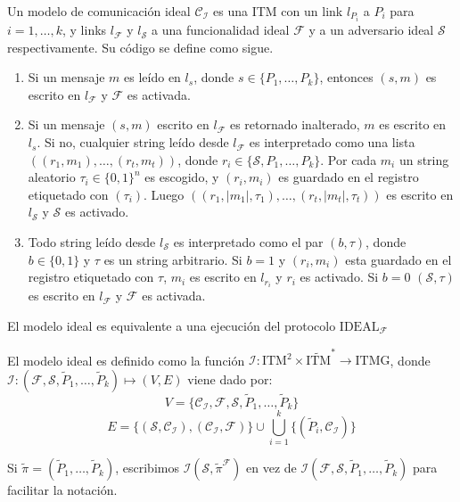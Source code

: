 \begin{definicion}
Un modelo de comunicación ideal $\mathcal{C_I}$ es una ITM con un link $l_{P_i}$ a 
$P_i$ para $i = 1, \ldots, k$,
y links $l_\mathcal{F}$ y $l_\mathcal{S}$ a una funcionalidad ideal $\mathcal{F}$
y a un adversario ideal $\mathcal{S}$ respectivamente. Su código se define como sigue.
\begin{enumerate}
  \item Si un mensaje $m$ es leído en $l_s$, donde $s \in \{P_1, \ldots, P_k\}$,
        entonces $(s, m)$ es escrito en $l_\mathcal{F}$ y $\mathcal{F}$ es activada.
  \item Si un mensaje $(s, m)$ escrito en $l_\mathcal{F}$ es retornado inalterado, $m$ es
        escrito en $l_s$. Si no, cualquier string leído desde $l_\mathcal{F}$ es interpretado
        como una lista $((r_1, m_1), \ldots, (r_t, m_t))$, donde $r_i \in \{\mathcal{S},
        P_1, \ldots, P_k\}$. Por cada $m_i$ un string aleatorio $\tau_i \in \{0, 1\}^n$ es
        escogido, y $(r_i, m_i)$ es guardado en el registro etiquetado con $(\tau_i)$. Luego
        $((r_1, |m_1|, \tau_1), \ldots, (r_t, |m_t|, \tau_t))$ es
        escrito en $l_\mathcal{S}$ y $\mathcal{S}$ es activado.
  \item Todo string leído desde $l_\mathcal{S}$ es interpretado como el par $(b, \tau)$, donde
        $b \in \{0, 1\}$ y $\tau$ es un string arbitrario. Si $b = 1$ y $(r_i, m_i)$
        esta guardado en el registro etiquetado con $\tau$, $m_i$ es escrito en $l_{r_i}$
        y $r_i$ es activado. Si $b = 0$ $(\mathcal{S}, \tau)$ es escrito en
        $l_\mathcal{F}$ y $\mathcal{F}$ es activada.
\end{enumerate}
\end{definicion}

El modelo ideal es equivalente a una ejecución del protocolo $\textrm{IDEAL}_{\mathcal{F}}$

\begin{definicion}
El modelo ideal es definido como la función $\mathcal{I}:\textrm{ITM}^2 \times
\tilde{\textrm{ITM}}^* \to \textrm{ITMG}$, donde $\mathcal{I}: (\mathcal{F}, \mathcal{S},
\tilde{P}_1, \ldots, \tilde{P}_k) \mapsto (V, E)$ viene dado por:
$$V = \{\mathcal{C_I}, \mathcal{F}, \mathcal{S}, \tilde{P}_1, \ldots, \tilde{P}_k\}$$
$$E = \{(\mathcal{S}, \mathcal{C_I}), (\mathcal{C_I}, \mathcal{F})\} \cup
\bigcup_{i = 1}^{k}\{(\tilde{P}_i, \mathcal{C_I})\}$$
\end{definicion}

Si $\tilde{\pi} = (\tilde{P}_1, \ldots, \tilde{P}_k)$, escribimos
$\mathcal{I}(\mathcal{S}, \tilde{\pi}^\mathcal{F})$ en vez de $\mathcal{I}(\mathcal{F},
\mathcal{S}, \tilde{P}_1, \ldots, \tilde{P}_k)$ para facilitar la notación.\\

